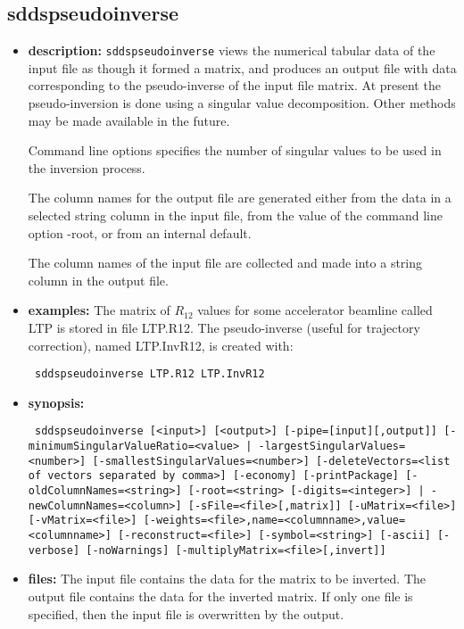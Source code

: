%
\newpage

%
%
\subsection{sddspseudoinverse}
\label{sddspseudoinverse}

\begin{itemize}
\item {\bf description:}
%
%
\verb|sddspseudoinverse| views the numerical tabular data of the input file
as though it formed a matrix, and produces an output
file with data corresponding to the pseudo-inverse of the input
file matrix. At present the pseudo-inversion is done using
a singular value decomposition. Other methods may be made available in the future.

Command line options specifies the number of singular values to be
used in the inversion process.

The column names for the output file are generated either from the data in
a selected string column in the input file,
from the value of the command line option -root,
or from an internal default.

The column names of the input file are collected and made into
a string column in the output file.

\item {\bf examples:} 
%
% 
%
The matrix of $R_{12}$ values for some accelerator beamline called LTP
is stored in file LTP.R12.
The pseudo-inverse (useful for trajectory correction), named
LTP.InvR12, is created with:

\begin{flushleft}{\tt
sddspseudoinverse LTP.R12 LTP.InvR12
}\end{flushleft}
\item {\bf synopsis:} 
%
%
\begin{flushleft}{\tt
sddspseudoinverse [<input>] [<output>] [-pipe=[input][,output]]
    [{-minimumSingularValueRatio=<value> | -largestSingularValues=<number>}] 
    [-smallestSingularValues=<number>] 
    [-deleteVectors=<list of vectors separated by comma>] 
    [-economy] [-printPackage] 
    [-oldColumnNames=<string>] [{-root=<string> [-digits=<integer>] | 
    -newColumnNames=<column>}] [-sFile=<file>[,matrix]] [-uMatrix=<file>] [-vMatrix=<file>] 
    [-weights=<file>,name=<columnname>,value=<columnname>]
    [-reconstruct=<file>] [-symbol=<string>] [-ascii] [-verbose] [-noWarnings]
    [-multiplyMatrix=<file>[,invert]]
}\end{flushleft}
\item {\bf files:}
The input file contains the data for the matrix to be inverted. The output file
contains the data for the inverted matrix. If only one file is specified,
then the input file is overwritten by the output.


\end{itemize}
